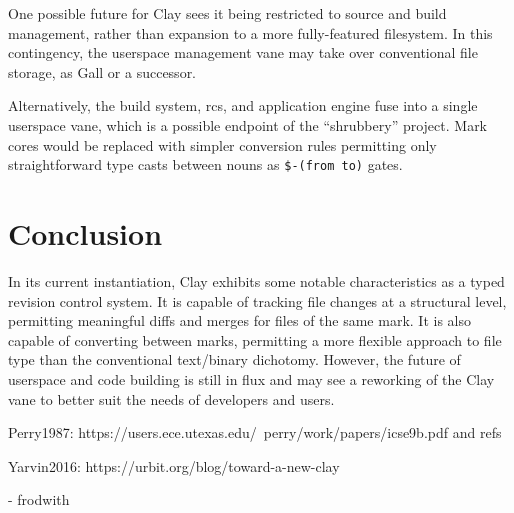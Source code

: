 \documentclass[twoside]{article}
\begin{document}
One possible future for Clay sees it being restricted to source and build management, rather than expansion to a more fully-featured filesystem.  In this contingency, the userspace management vane may take over conventional file storage, as Gall or a successor.

Alternatively, the build system, {\sc rcs}, and application engine fuse into a single userspace vane, which is a possible endpoint of the ``shrubbery'' project.  Mark cores would be replaced with simpler conversion rules permitting only straightforward type casts between nouns as \lstinline[style=inlinecode]{$-(from to)} gates.

\section{Conclusion}

In its current instantiation, Clay exhibits some notable characteristics as a typed revision control system.  It is capable of tracking file changes at a structural level, permitting meaningful diffs and merges for files of the same mark.  It is also capable of converting between marks, permitting a more flexible approach to file type than the conventional text/binary dichotomy.  However, the future of userspace and code building is still in flux and may see a reworking of the Clay vane to better suit the needs of developers and users.

Perry1987:  https://users.ece.utexas.edu/~perry/work/papers/icse9b.pdf
and refs

Yarvin2016: https://urbit.org/blog/toward-a-new-clay


- frodwith



\printbibliography
\end{document}
